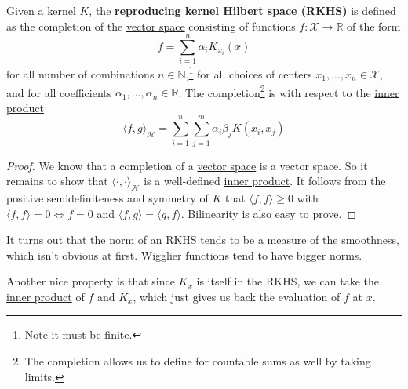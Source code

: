   \begin{definition}
    \label{def:reproducing-kernel-hilbert-space}
    Given a kernel $K$, the \textbf{reproducing kernel Hilbert space (RKHS)} is defined as the completion of the \hyperref[lin-def:vector-space]{vector space} consisting of functions $f: \mathcal{X} \to \mathbb{R}$ of the form
    \begin{equation}
      f = \sum_{i=1}^n \alpha_i K_{x_i} (x) 
    \end{equation}
    for all number of combinations $n \in \mathbb{N}$,\footnote{Note it must be finite.} for all choices of centers $x_1, \ldots, x_n \in \mathcal{X}$, and for all coefficients $\alpha_1, \ldots, \alpha_n \in \mathbb{R}$. The completion\footnote{The completion allows us to define for countable sums as well by taking limits.} is with respect to the \hyperref[lin-def:inner-product]{inner product} 
    \begin{equation}
      \langle f, g \rangle_{\mathcal{H}} = \sum_{i=1}^n \sum_{j=1}^m \alpha_i \beta_j K(x_i, x_j)
    \end{equation}
  \end{definition}
  \begin{proof}
    We know that a completion of a \hyperref[lin-def:vector-space]{vector space} is a vector space. So it remains to show that $\langle \cdot, \cdot \rangle_{\mathcal{H}}$ is a well-defined \hyperref[lin-def:inner-product]{inner product}. It follows from the positive semidefiniteness and symmetry of $K$ that $\langle f, f \rangle \geq 0$ with $\langle f, f \rangle = 0 \iff f = 0$ and $\langle f, g \rangle = \langle g, f \rangle$. Bilinearity is also easy to prove. 
  \end{proof}

  It turns out that the norm of an RKHS tends to be a measure of the smoothness, which isn't obvious at first. Wigglier functions tend to have bigger norms. 

  Another nice property is that since $K_x$ is itself in the RKHS, we can take the \hyperref[lin-def:inner-product]{inner product} of $f$ and $K_x$, which just gives us back the evaluation of $f$ at $x$. 

